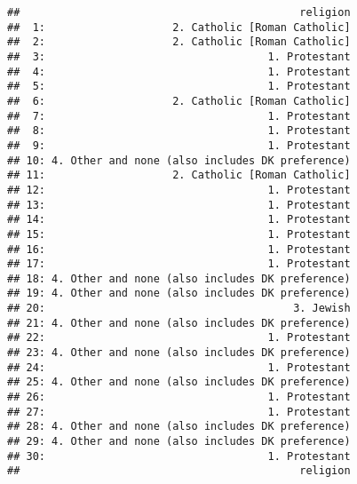 \documentclass[
]{article}
\newenvironment{Shaded}{\begin{snugshade}}{\end{snugshade}}
\newcommand{\KeywordTok}[1]{\textcolor[rgb]{0.13,0.29,0.53}{\textbf{#1}}}
\newcommand{\NormalTok}[1]{#1}
\newcommand{\OperatorTok}[1]{\textcolor[rgb]{0.81,0.36,0.00}{\textbf{#1}}}
\newcommand{\StringTok}[1]{\textcolor[rgb]{0.31,0.60,0.02}{#1}}
\begin{document}
\begin{verbatim}
##                                            religion
##  1:                    2. Catholic [Roman Catholic]
##  2:                    2. Catholic [Roman Catholic]
##  3:                                   1. Protestant
##  4:                                   1. Protestant
##  5:                                   1. Protestant
##  6:                    2. Catholic [Roman Catholic]
##  7:                                   1. Protestant
##  8:                                   1. Protestant
##  9:                                   1. Protestant
## 10: 4. Other and none (also includes DK preference)
## 11:                    2. Catholic [Roman Catholic]
## 12:                                   1. Protestant
## 13:                                   1. Protestant
## 14:                                   1. Protestant
## 15:                                   1. Protestant
## 16:                                   1. Protestant
## 17:                                   1. Protestant
## 18: 4. Other and none (also includes DK preference)
## 19: 4. Other and none (also includes DK preference)
## 20:                                       3. Jewish
## 21: 4. Other and none (also includes DK preference)
## 22:                                   1. Protestant
## 23: 4. Other and none (also includes DK preference)
## 24:                                   1. Protestant
## 25: 4. Other and none (also includes DK preference)
## 26:                                   1. Protestant
## 27:                                   1. Protestant
## 28: 4. Other and none (also includes DK preference)
## 29: 4. Other and none (also includes DK preference)
## 30:                                   1. Protestant
##                                            religion
\end{verbatim}

\begin{Shaded}
\end{Shaded}
\end{document}
